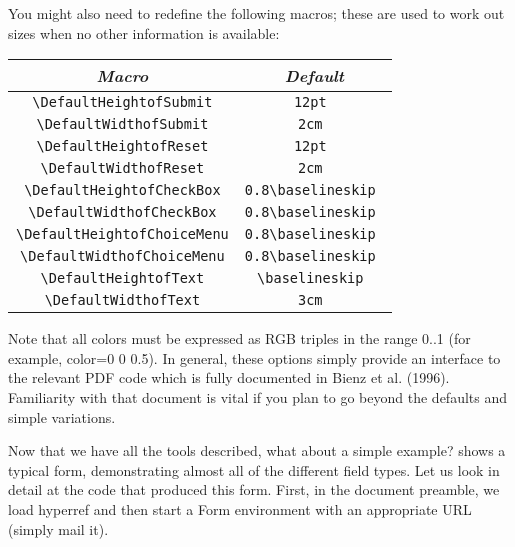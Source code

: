You might also need to redefine the following macros; these are used to
work out sizes when no other information is available: 

 
\begin{center}
  \begin{tabular}{cc}
  
  \emph{Macro}                      & \emph{Default}           \\
  \hline
  
  \verb|\DefaultHeightofSubmit|     & \verb|12pt |             \\
  \verb|\DefaultWidthofSubmit|      & \verb|2cm |              \\
  \verb|\DefaultHeightofReset|      & \verb|12pt |             \\
  \verb|\DefaultWidthofReset|       & \verb|2cm |              \\
  \verb|\DefaultHeightofCheckBox|   & \verb|0.8\baselineskip | \\
  \verb|\DefaultWidthofCheckBox|    & \verb|0.8\baselineskip | \\
  \verb|\DefaultHeightofChoiceMenu| & \verb|0.8\baselineskip | \\
  \verb|\DefaultWidthofChoiceMenu|  & \verb|0.8\baselineskip | \\
  \verb|\DefaultHeightofText|       & \verb|\baselineskip |    \\
  \verb|\DefaultWidthofText|        & \verb|3cm |              \\
  
  \hline
  
  \end{tabular}
\end{center}


Note that all colors must be expressed as RGB triples in the range 0..1
(for example, color=0 0 0.5). In general, these options simply provide
an interface to the relevant PDF code which is fully documented in Bienz
et al. (1996). Familiarity with that document is vital if you plan to go
beyond the defaults and simple variations. 

Now that we have all the tools described, what about a simple example?
 shows a typical form, demonstrating almost all of the
different field types.  Let us look in detail at the code that produced
this form. First, in the document preamble, we load hyperref and then
start a Form environment with an appropriate URL (simply mail it). 

